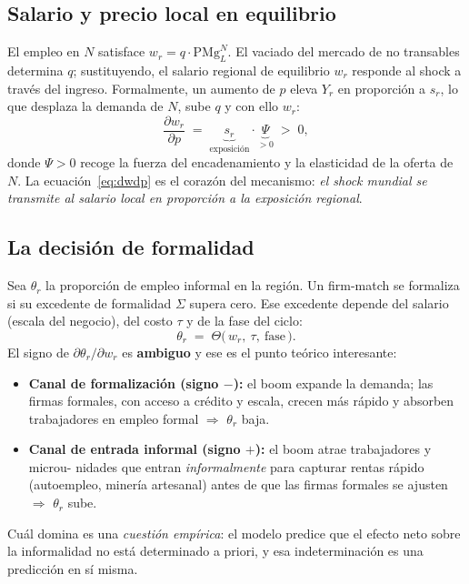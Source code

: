 \documentclass[11pt]{article}
\theoremstyle{definition}
\theoremstyle{plain}
\begin{document}
\subsection{Salario y precio local en equilibrio}
El empleo en $N$ satisface $w_r = q\cdot \mathrm{PMg}_L^N$. El vaciado del mercado de no
transables determina $q$; sustituyendo, el salario regional de equilibrio $w_r$ responde al
shock a través del ingreso. Formalmente, un aumento de $p$ eleva $Y_r$ en proporción a $s_r$,
lo que desplaza la demanda de $N$, sube $q$ y con ello $w_r$:
\begin{equation}
\frac{\partial w_r}{\partial p} \;=\; \underbrace{s_r}_{\text{exposición}}\cdot
\underbrace{\Psi}_{>0}\;>\;0,
\label{eq:dwdp}
\end{equation}
donde $\Psi>0$ recoge la fuerza del encadenamiento y la elasticidad de la oferta de $N$. La
ecuación~\eqref{eq:dwdp} es el corazón del mecanismo: \emph{el shock mundial se transmite al
salario local en proporción a la exposición regional}.

\subsection{La decisión de formalidad}
Sea $\theta_r$ la proporción de empleo informal en la región. Un firm-match se formaliza si su
excedente de formalidad $\Sigma$ supera cero. Ese excedente depende del salario (escala del
negocio), del costo $\tau$ y de la fase del ciclo:
\begin{equation}
\theta_r \;=\; \Theta\big(\,w_r,\ \tau,\ \text{fase}\,\big).
\end{equation}
El signo de $\partial \theta_r/\partial w_r$ es \textbf{ambiguo} y ese es el punto teórico
interesante:
\begin{itemize}[leftmargin=1.6em, itemsep=1pt]
  \item \textbf{Canal de formalización (signo $-$):} el boom expande la demanda; las firmas
  formales, con acceso a crédito y escala, crecen más rápido y absorben trabajadores en empleo
  formal $\Rightarrow$ $\theta_r$ baja.
  \item \textbf{Canal de entrada informal (signo $+$):} el boom atrae trabajadores y microu-
  nidades que entran \emph{informalmente} para capturar rentas rápido (autoempleo, minería
  artesanal) antes de que las firmas formales se ajusten $\Rightarrow$ $\theta_r$ sube.
\end{itemize}
Cuál domina es una \emph{cuestión empírica}: el modelo predice que el efecto neto sobre la
informalidad no está determinado a priori, y esa indeterminación es una predicción en sí misma.
\end{document}
